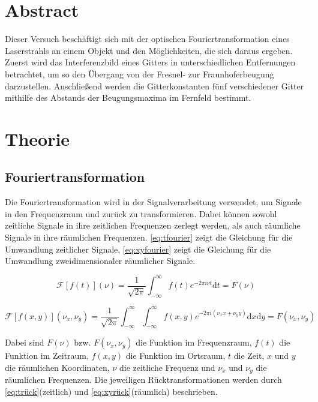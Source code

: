 \section{Abstract}
Dieser Versuch beschäftigt sich mit der optischen Fouriertransformation eines Laserstrahls an einem Objekt und den Möglichkeiten, die sich daraus ergeben. Zuerst wird das Interferenzbild eines Gitters in unterschiedlichen Entfernungen betrachtet, um so den Übergang von der Fresnel- zur Fraunhoferbeugung darzustellen. Anschließend werden die Gitterkonstanten fünf verschiedener Gitter mithilfe des Abstands der Beugungsmaxima im Fernfeld bestimmt.



\section{Theorie\cite{anleitung-ws2014}}
\subsection{Fouriertransformation}
Die Fouriertransformation wird in der Signalverarbeitung verwendet, um Signale in den Frequenzraum und zurück zu transformieren. Dabei können sowohl zeitliche Signale in ihre zeitlichen Frequenzen zerlegt werden, als auch räumliche Signale in ihre räumlichen Frequenzen. \cref{eq:tfourier} zeigt die Gleichung für die Umwandlung zeitlicher Signale, \cref{eq:xyfourier} zeigt die Gleichung für die Umwandlung zweidimensionaler räumlicher Signale.

\begin{equation}
	\mathcal{F}\left[ f\left( t\right) \right] \left( \nu\right) = \frac{1}{\sqrt{2\pi}} \int_{-\infty}^{\infty} f\left( t\right) e^{-2\pi i \nu t} \text{d}t = F\left( \nu\right) 
	\label{eq:tfourier}
\end{equation}

\begin{equation}
	\mathcal{F}\left[ f\left( x,y\right) \right] \left( \nu_x, \nu_y\right) = \frac{1}{\sqrt{2\pi}} \int_{-\infty}^{\infty} \int_{-\infty}^{\infty} f\left( x, y\right) e^{-2\pi i (\nu_x x + \nu_y y)} \text{d}x \text{d}y = F\left( \nu_x, \nu_y\right) 
	\label{eq:xyfourier}
\end{equation}

Dabei sind $F\left( \nu\right)$ bzw. $F\left( \nu_x, \nu_y\right)$ die Funktion im Frequenzraum, $f\left( t\right)$ die Funktion im Zeitraum, $f\left( x,y\right)$ die Funktion im Ortsraum, $t$ die Zeit, $x$ und $y$ die räumlichen Koordinaten, $\nu$ die zeitliche Frequenz und $\nu_x$ und $\nu_y$ die räumlichen Frequenzen. Die jeweiligen Rücktransformationen werden durch \cref{eq:trück}(zeitlich) und \cref{eq:xyrück}(räumlich) beschrieben.


